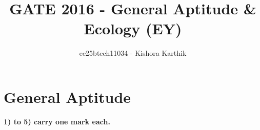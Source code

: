\documentclass[journal]{IEEEtran}
\begin{document}
\vspace{3cm}


\title{GATE 2016 - General Aptitude \& Ecology (EY)}
\author{ee25btech11034 - Kishora Karthik}
\maketitle

{\let\newpage\relax\maketitle}

\renewcommand{\thefigure}{\theenumi}
\renewcommand{\thetable}{\theenumi}
\setlength{\intextsep}{10pt} 

\section*{\textbf{General Aptitude}}
\textbf{1) to 5) carry one mark each.}
 
\end{document}
